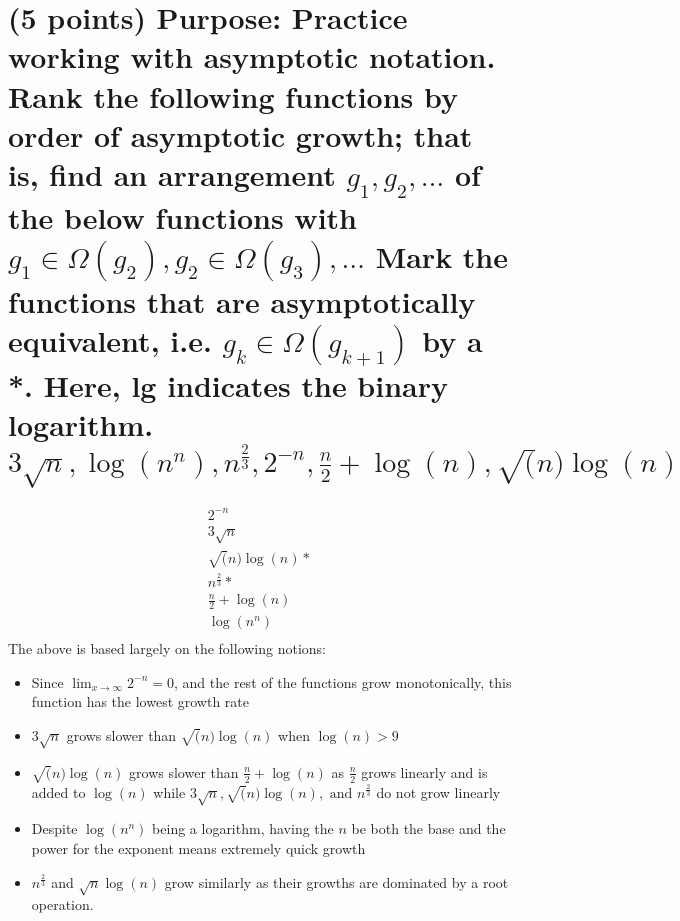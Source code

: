 \documentclass[a4paper,11pt]{article}
\theoremstyle{mytheor}
\begin{document}
\section{(5 points) Purpose: Practice working with asymptotic notation. Rank the
following functions by order of asymptotic growth; that is, find an arrangement
$g_1, g_2, \ldots$ of the below functions with $g_1 \in \Omega(g_2), g_2 \in
\Omega(g_3), \ldots$ Mark the functions that are asymptotically equivalent, i.e.
$g_k \in \Omega(g_{k+1})$ by a *. Here, lg indicates the binary logarithm.
$3\sqrt{n}, \log(n^n), n^{\frac{2}{3}}, 2^{-n}, \frac{n}{2}+\log(n),
\sqrt(n)\log(n)$}

\begin{align}
    2^{-n}              \\
    3\sqrt{n}           \\
    \sqrt(n)\log(n) *    \\ 
    n^{\frac{2}{3}} *    \\
    \frac{n}{2}+\log(n) \\
    \log(n^n)           \\
\end{align}
The above is based largely on the following notions: 
\begin{itemize}
    \item Since $\lim_{x\to\infty}2^{-n} = 0$, and the rest of the functions
    grow monotonically, this function has the lowest growth rate
    \item $3\sqrt{n}$ grows slower than $\sqrt(n)\log(n)$ when $\log(n) > 9$
    \item $\sqrt(n)\log(n)$ grows slower than $\frac{n}{2}+\log(n)$ as
    $\frac{n}{2}$ grows linearly and is added to $\log(n)$ while 
    $3\sqrt{n}, \sqrt(n)\log(n), \text{ and } n^{\frac{2}{3}}$ do not grow
    linearly 
    \item Despite $\log(n^n)$ being a logarithm, having the $n$ be both the base
    and the power for the exponent means extremely quick growth
    \item $n^{\frac{2}{3}}$ and $\sqrt{n}\log(n)$ grow similarly as their growths
    are dominated by a root operation. 
\end{itemize}

\clearpage



\end{document}
